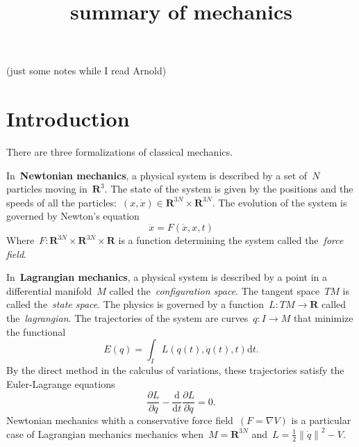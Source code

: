 

\newcommand{\1}{\mathbf{1}}
\newcommand{\R}{\mathbf{R}}
\newcommand{\T}{\mathbf{T}}
\newcommand{\Z}{\mathbf{Z}}
\newcommand{\ud}{\mathrm{d}}
\newcommand{\ds}{\displaystyle}

\newcommand{\abs}[1]{\left|#1\right|}
\newcommand{\Abs}[1]{\left\|#1\right\|}
\newcommand{\ABS}[1]{{\left\vert\kern-0.25ex\left\vert\kern-0.25ex\left\vert #1 \right\vert\kern-0.25ex\right\vert\kern-0.25ex\right\vert}}

\newcommand{\parens}[1]{\left(#1\right)} %
\newcommand{\pairing}[2]{\left\langle #1,\,#2\right\rangle} %




\title{summary of mechanics}

(just some notes while I read Arnold)

\section{Introduction}

There are three formalizations of classical mechanics.

In~{\bf Newtonian mechanics}, a physical system is described by a set of~$N$
particles moving in~$\R^3$.  The state of the system is given by the
positions and the speeds of all the
particles:~$(x,\dot x)\in\R^{3N}\times\R^{3N}$.  The evolution of the system
is governed by Newton's equation
\[
	\ddot x=F(\dot x, x,t)
\]
Where~$F:\R^{3N}\times\R^{3N}\times\R$ is a function determining the system
called the~\emph{force field}.

In~{\bf Lagrangian mechanics}, a physical system is described by a point in
a differential manifold~$M$ called the~\emph{configuration space}.  The tangent
space~$TM$ is called the~\emph{state space}.  The physics is governed by a
function~$L:TM\to\R$ called the~\emph{lagrangian}.  The trajectories of the system
are curves~$q:I\to M$ that minimize the functional
\[
	E(q)=\int_I L(q(t),\dot q(t),t)\mathrm{d}t.
\]
By the direct method in the calculus of variations, these trajectories
satisfy the Euler-Lagrange equations
\[
	\frac{\partial L}{\partial q}
	-\frac{\mathrm{d}}{\mathrm{d}t}\frac{\partial L}{\partial\dot q} = 0.
\]
Newtonian mechanics whith a conservative force field~$(F=\nabla V)$
is a particular case of Lagrangian mechanics
mechanics when~$M=\R^{3N}$ and~$L=\frac12\left\|\dot q\right\|^2-V$.


